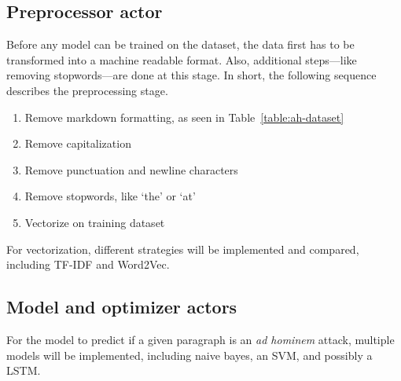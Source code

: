 \documentclass[a4paper]{article}
\begin{document}
\subsection{Preprocessor actor}
Before any model can be trained on the dataset, the data first has to be transformed into a machine readable format. Also, additional steps---like removing stopwords---are done at this stage. In short, the following sequence describes the preprocessing stage.

\begin{enumerate}
    \item Remove markdown formatting, as seen in Table~\ref{table:ah-dataset}
    \item Remove capitalization
    \item Remove punctuation and newline characters
    \item Remove stopwords, like `the' or `at'
    \item Vectorize on training dataset
\end{enumerate} 

For vectorization, different strategies will be implemented and compared, including TF-IDF and Word2Vec.

\subsection{Model and optimizer actors}
For the model to predict if a given paragraph is an \emph{ad hominem} attack, multiple models will be implemented, including naive bayes, an SVM, and possibly a LSTM. 



\end{document}
